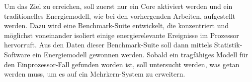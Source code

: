 \documentclass[a4paper,DIV=15]{scrartcl}
\newcommand{\JWlone}[1]{\medskip}
\begin{document}
\JWlone{Lösungsansatz}

Um das Ziel zu erreichen, soll zuerst nur ein Core aktiviert werden und ein
traditionelles Energiemodell, wie bei den vorhergenden Arbeiten, aufgestellt
werden. Dazu wird eine Benchmark-Suite entwickelt, die konzentriert und
möglichst voneinander isoliert einige energierelevante Ereignisse im Prozessor
hervorruft. Aus den Daten dieser Benchmark-Suite soll dann mittels
Statistik-Software ein Energiemodell gewonnen werden. Sobald ein tragfähiges
Modell für den Einprozessor-Fall gefunden worden ist, soll untersucht werden,
was getan werden muss, um es auf ein Mehrkern-System zu erweitern.
\end{document}
